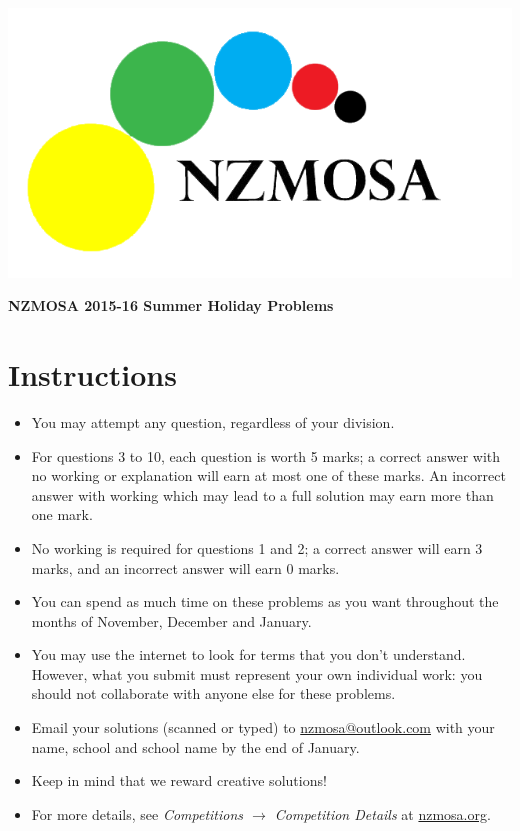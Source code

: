 \documentclass[a4paper,12pt]{article}
\begin{document}

\includegraphics[scale=0.4]{logo.png}
\begin{center}
\LARGE
\textbf{NZMOSA 2015-16 Summer Holiday Problems}
\end{center}


\normalsize
\section*{Instructions}
\begin{itemize}
    \item You may attempt any question, regardless of your division.
    \item For questions 3 to 10, each question is worth 5 marks; a correct answer with no working or explanation will earn at most one of these marks. An incorrect answer with working which may lead to a full solution may earn more than one mark.
    \item No working is required for questions 1 and 2; a correct answer will earn 3 marks, and an incorrect answer will earn 0 marks.
    \item You can spend as much time on these problems as you want throughout the months of November, December and January.
    \item You may use the internet to look for terms that you don't understand. However, what you submit must represent your own individual work: you should not collaborate with anyone else for these problems.
    \item Email your solutions (scanned or typed) to \url{nzmosa@outlook.com} with your name, school and school name by the end of January.
    \item Keep in mind that we reward creative solutions!
    \item For more details, see \textit{Competitions $\to$ Competition Details} at \url{nzmosa.org}.
\end{itemize}
\end{document}

